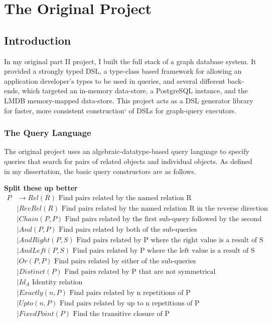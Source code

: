 \documentclass{report}
\newcommand \2[0]{\textbf{2}}
\newcommand \3[0]{\textbf{3}}
\newcommand{\todo}[1]{\textbf{#1}}
\begin{document}
\tableofcontents
\newpage

\chapter{The Original Project}
\section{Introduction}
In my original part II project, I built the full stack of a graph database system. It provided a strongly typed DSL, a type-class based framework for allowing an application developer's types to be used in queries, and several different back-ends, which targeted an in-memory data-store, a PostgreSQL instance, and the LMDB memory-mapped data-store. This project acts as a DSL generator library for faster, more consistent construction` of DSLs for graph-query executors.
\subsection{The Query Language}\label{LangDef}
The original project uses an algebraic-datatype-based query language to specify queries that search for pairs of related objects and individual objects. As defined in my dissertation, the basic query constructors are as follows.

\todo{Split these up better}
\begin{equation}\label{PairQueries}
    \begin{split}
    P  &\rightarrow Rel(R) \mbox{ Find pairs related by the named relation R}\\
    &\mid RevRel(R) \mbox{ Find pairs related by the named relation R in the reverse direction}\\
    &\mid Chain(P, P) \mbox{   Find pairs related by the first sub-query followed by the second}\\
    &\mid And(P, P) \mbox{  Find pairs related by both of the sub-queries}\\
    &\mid AndRight(P, S) \mbox{  Find pairs related by P where the right value is a result of S}\\
    &\mid AndLeft(P, S) \mbox{  Find pairs related by P where the left value is a result of S}\\
    &\mid Or(P, P) \mbox{  Find pairs related by either of the sub-queries}\\
    &\mid Distinct(P) \mbox{  Find pairs related by P that are not symmetrical}\\
    &\mid Id_A \mbox{ Identity relation}\\
    &\mid Exactly(\mathit{n}, P) \mbox{  Find pairs related by n repetitions of P}\\
    &\mid Upto(\mathit{n}, P) \mbox{  Find pairs related by up to n repetitions of P}\\
    &\mid FixedPoint(P) \mbox{  Find the transitive closure of P}\\
    \end{split}
    \end{equation} 
\end{document}
